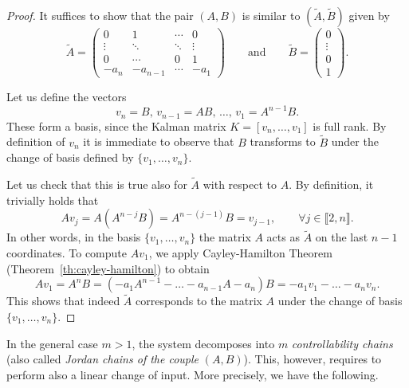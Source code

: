 \begin{proof}
    It suffices to show that the pair $(A,B)$ is similar to $(\tilde A, \tilde B)$ given by 
    \begin{equation}
        \tilde A = 
        \begin{pmatrix}
            0 & 1 &  \cdots & 0 \\
            \vdots & \ddots & \ddots & \vdots \\
            0 & \cdots &  0 & 1 \\
            -a_n & -a_{n-1} &  \cdots & -a_1 
        \end{pmatrix}
        \qquad\text{and}\qquad
        \tilde B = 
        \begin{pmatrix}
            0\\ \vdots \\ 0 \\ 1
        \end{pmatrix}.
    \end{equation} 
    
    Let us define the vectors 
    \begin{equation}
        v_n = B, \, v_{n-1} = A B,\, \ldots ,\, v_1 = A^{n-1}B.
    \end{equation}
    These form a basis, since the Kalman matrix $K = [v_n,\ldots, v_1]$ is full rank. 
    By definition of $v_n$ it is immediate to observe that $B$ transforms to $\tilde B$ under the change of basis defined by $\{v_1,\ldots,v_n\}$.

    Let us check that this is true also for $\tilde A$ with respect to $A$.
    By definition, it trivially holds that 
    \begin{equation}
        A v_{j} = A \left(A^{n-j}B\right) = A^{n-(j-1)}B =  v_{j-1}, \qquad \forall j\in \llbracket 2,n\rrbracket.
    \end{equation}
    In other words, in the basis $\{v_1,\ldots, v_n\}$ the matrix $A$ acts as $\tilde A$ on the last $n-1$ coordinates.
    To compute $A v_1$, we apply Cayley-Hamilton Theorem (Theorem~\ref{th:cayley-hamilton}) to obtain
    \begin{equation}
        A v_1 = A^n B = (-a_{1}A^{n-1}- \ldots - a_{n-1}A-a_n)B = -a_1 v_1 - \ldots -a_n v_n.
    \end{equation}
    This shows that indeed $\tilde A$ corresponds to the matrix $A$ under the change of basis $\{v_1,\ldots,v_n\}$. 
\end{proof}

In the general case $m > 1$, the system decomposes into $m$ \emph{controllability chains} (also called \emph{Jordan chains of the couple} $(A,B)$).
This, however, requires to perform also a linear change of input.
More precisely, we have the following.

